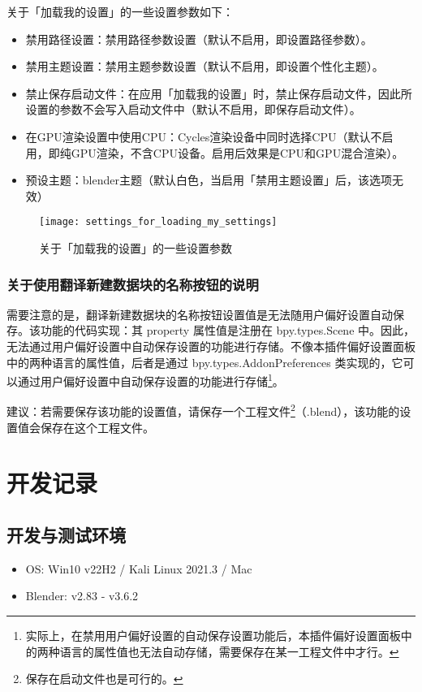 \documentclass{../../public_resources/doc}
\begin{document}
关于「加载我的设置」的一些设置参数如下：
\hypertarget{加载我的设置小节}{}
\begin{itemize}
    \item 禁用路径设置：禁用路径参数设置（默认不启用，即设置路径参数）。
    \item 禁用主题设置：禁用主题参数设置（默认不启用，即设置个性化主题）。
    \item 禁止保存启动文件：在应用「加载我的设置」时，禁止保存启动文件，因此所设置的参数不会写入启动文件中（默认不启用，即保存启动文件）。
    \item 在GPU渲染设置中使用CPU：Cycles渲染设备中同时选择CPU（默认不启用，即纯GPU渲染，不含CPU设备。启用后效果是CPU和GPU混合渲染）。
    \item 预设主题：blender主题（默认白色，当启用「禁用主题设置」后，该选项无效）
\end{itemize}

\begin{figure}[h!]
    \texttt{[image: settings\_for\_loading\_my\_settings]}
    \caption{关于「加载我的设置」的一些设置参数}
    \label{加载我的设置的设置参数}
\end{figure}

\subsubsection{关于使用翻译新建数据块的名称按钮的说明}
需要注意的是，翻译新建数据块的名称按钮设置值是无法随用户偏好设置自动保存。该功能的代码实现：其 property 属性值是注册在 bpy.types.Scene 中。因此，无法通过用户偏好设置中自动保存设置的功能进行存储。不像本插件偏好设置面板中的两种语言的属性值，后者是通过 bpy.types.AddonPreferences 类实现的，它可以通过用户偏好设置中自动保存设置的功能进行存储\footnote{实际上，在禁用用户偏好设置的自动保存设置功能后，本插件偏好设置面板中的两种语言的属性值也无法自动存储，需要保存在某一工程文件中才行。}。

建议：若需要保存该功能的设置值，请保存一个工程文件\footnote{保存在启动文件也是可行的。}（.blend），该功能的设置值会保存在这个工程文件。

\section{开发记录}
\subsection{开发与测试环境}
\begin{itemize}
    \item OS: Win10 v22H2 / Kali Linux 2021.3 / Mac
    \item Blender: v2.83 ‑ v3.6.2
\end{itemize}
\end{document}
